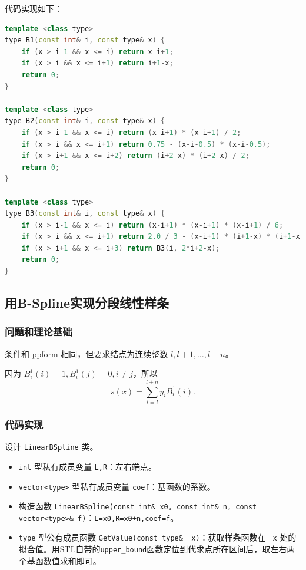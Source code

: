 \documentclass{ctexart}
\begin{document}
代码实现如下：

\begin{lstlisting}[language={c++}]
template <class type>
type B1(const int& i, const type& x) {
	if (x > i-1 && x <= i) return x-i+1;
	if (x > i && x <= i+1) return i+1-x;
	return 0;
}

template <class type>
type B2(const int& i, const type& x) {
	if (x > i-1 && x <= i) return (x-i+1) * (x-i+1) / 2;
	if (x > i && x <= i+1) return 0.75 - (x-i-0.5) * (x-i-0.5);
	if (x > i+1 && x <= i+2) return (i+2-x) * (i+2-x) / 2;
	return 0;
}

template <class type>
type B3(const int& i, const type& x) {
	if (x > i-1 && x <= i) return (x-i+1) * (x-i+1) * (x-i+1) / 6;
	if (x > i && x <= i+1) return 2.0 / 3 - (x-i+1) * (i+1-x) * (i+1-x) / 2;
	if (x > i+1 && x <= i+3) return B3(i, 2*i+2-x);
	return 0;
}
\end{lstlisting}

\subsection{用B-Spline实现分段线性样条}

\subsubsection{问题和理论基础}
条件和 ppform 相同，但要求结点为连续整数 $l,l+1,\dots,l+n$。

因为 $B_i^1(i)=1,B_i^1(j)=0,i\neq j$，所以
\begin{equation}
s(x)=\sum_{i=l}^{l+n}y_iB_i^1(i).
\end{equation}

\subsubsection{代码实现}

设计 \verb|LinearBSpline| 类。

\begin{itemize}
\item \verb|int| 型私有成员变量 \verb|L,R|：左右端点。
\item \verb|vector<type>| 型私有成员变量 \verb|coef|：基函数的系数。
\item 构造函数 \verb|LinearBSpline(const int& x0, const int& n, const vector<type>& f)|：\verb|L=x0,R=x0+n,coef=f|。
\item \verb|type| 型公有成员函数 \verb|GetValue(const type& _x)|：获取样条函数在 \verb|_x| 处的拟合值。用STL自带的\verb|upper_bound|函数定位到代求点所在区间后，取左右两个基函数值求和即可。
\end{itemize}
\end{document}
